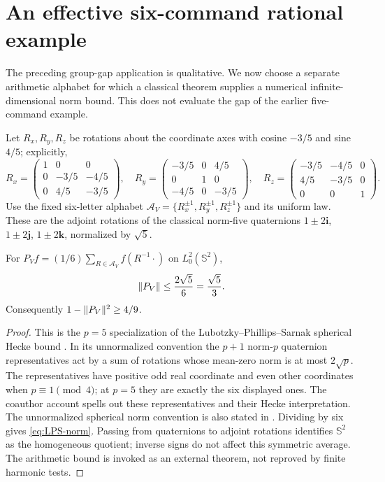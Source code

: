 \section{An effective six-command rational example}\label{sec:effective}
The preceding group-gap application is qualitative. We now choose a
separate arithmetic alphabet for which a classical theorem supplies a
numerical infinite-dimensional norm bound. This does not evaluate the
gap of the earlier five-command example.

Let $R_x,R_y,R_z$ be rotations about the coordinate axes with cosine
$-3/5$ and sine $4/5$; explicitly,
\begin{equation}\label{eq:six-gates}
 R_x=\begin{pmatrix}1&0&0\\0&-3/5&-4/5\\0&4/5&-3/5\end{pmatrix},\quad
 R_y=\begin{pmatrix}-3/5&0&4/5\\0&1&0\\-4/5&0&-3/5\end{pmatrix},\quad
 R_z=\begin{pmatrix}-3/5&-4/5&0\\4/5&-3/5&0\\0&0&1\end{pmatrix}.
\end{equation}
Use the fixed six-letter alphabet
$\mathcal A_V=\{R_x^{\pm1},R_y^{\pm1},R_z^{\pm1}\}$ and its uniform
law. These are the adjoint rotations of the classical norm-five
quaternions $1\pm2\mathbf i$, $1\pm2\mathbf j$, $1\pm2\mathbf k$,
normalized by $\sqrt5$.

\begin{proposition}\label{prop:LPS}
For $P_Vf=(1/6)\sum_{R\in\mathcal A_V}f(R^{-1}\cdot)$ on
$L^2_0(\mathbb S^2)$,
\begin{equation}\label{eq:LPS-norm}
                 \lVert P_V\rVert\le\frac{2\sqrt5}{6}=\frac{\sqrt5}{3}.
\end{equation}
Consequently $1-\lVert P_V\rVert^2\ge4/9$.
\end{proposition}
\begin{proof}
This is the $p=5$ specialization of the Lubotzky--Phillips--Sarnak
spherical Hecke bound \cite{LPS86,LPS87}. In its unnormalized convention
the $p+1$ norm-$p$ quaternion representatives act by a sum of rotations
whose mean-zero norm is at most $2\sqrt p$. The representatives have
positive odd real coordinate and even other coordinates when
$p\equiv1\pmod4$; at $p=5$ they are exactly the six displayed ones.
The coauthor account \cite[Section 3.2, the $V$-gate example]{PS}
spells out these representatives and their Hecke interpretation.
The unnormalized spherical norm convention is also stated in
\cite[Theorem 3(ii)]{Pisier}. Dividing by six gives
\eqref{eq:LPS-norm}. Passing from quaternions to adjoint rotations
identifies $\mathbb S^2$ as the homogeneous quotient; inverse signs do
not affect this symmetric average. The arithmetic bound is invoked as
an external theorem, not reproved by finite harmonic tests.
\end{proof}


